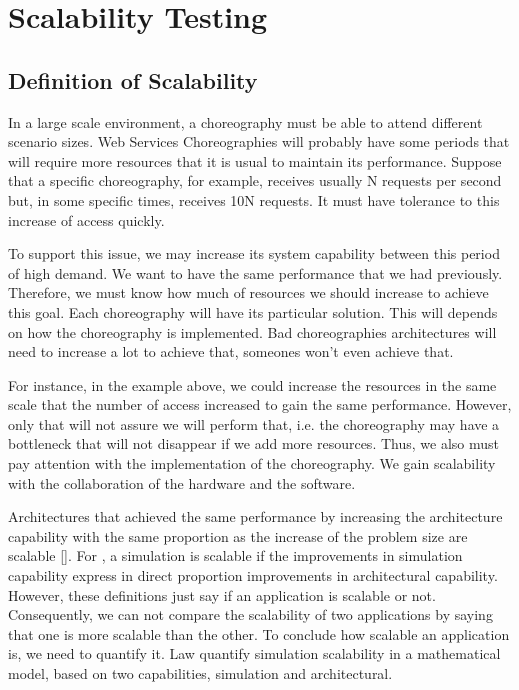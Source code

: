 \section{Scalability Testing}

\subsection{Definition of Scalability}
In a large scale environment, a choreography must be able to attend different scenario sizes. Web Services Choreographies will probably have some periods that will require more resources that it is usual to maintain its performance.  Suppose that a specific choreography, for example, receives usually N requests per second but, in some specific times, receives 10N requests. It must have tolerance to this increase of access quickly.

To support this issue, we may increase its system capability between this period of high demand. We want to have the same performance that we had previously. Therefore, we must know how much of resources we should increase to achieve this goal.  Each choreography will have its particular solution. This will depends on how the choreography is implemented. Bad choreographies architectures will need to increase a lot to achieve that, someones won't even achieve that.

For instance, in the example above, we could increase the resources in the same scale that the number of access increased to gain the same performance. However, only that will not assure we will perform that, i.e.  the choreography may have a bottleneck that will not disappear if we add more resources. Thus, we also must pay attention with the implementation of the choreography. We gain scalability with the collaboration of the hardware and the software. 

Architectures that achieved the same performance by increasing the architecture capability with the same proportion as the increase of the problem size are scalable [\citet{QUINN}]. For \citet{LAW}, a simulation is scalable if the improvements in simulation capability express in direct proportion improvements in architectural capability. However, these definitions just say if an application is scalable or not. Consequently, we can not compare the scalability of two applications by saying that one is more scalable than the other. To conclude how scalable an application is, we need to quantify it. Law quantify simulation scalability in a mathematical model, based on two capabilities, simulation and architectural. 


